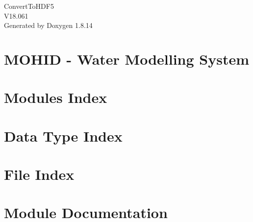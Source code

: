 \documentclass[twoside]{book}
\newcommand{\+}{\discretionary{\mbox{\scriptsize$\hookleftarrow$}}{}{}}
\newcommand{\clearemptydoublepage}{%
  \newpage{\pagestyle{empty}\cleardoublepage}%
}
\begin{document}
\hypersetup{pageanchor=false,
             bookmarksnumbered=true,
             pdfencoding=unicode
            }
\begin{titlepage}
\vspace*{7cm}
\begin{center}%
{\Large Convert\+To\+H\+D\+F5 \\[1ex]\large V18.\+061 }\\
\vspace*{1cm}
{\large Generated by Doxygen 1.8.14}\\
\end{center}
\end{titlepage}
\clearemptydoublepage
{}
\tableofcontents
\clearemptydoublepage
{}
\hypersetup{pageanchor=true}

\chapter{M\+O\+H\+ID -\/ Water Modelling System}
\label{index}\hypertarget{index}{}
\chapter{Modules Index}

\chapter{Data Type Index}

\chapter{File Index}

\chapter{Module Documentation}
































\end{document}
